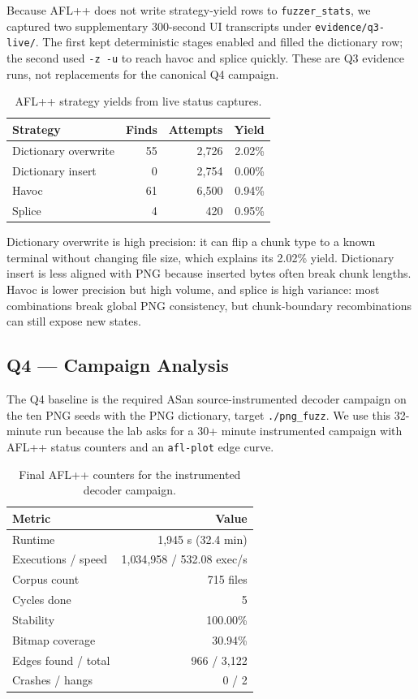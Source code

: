 \documentclass[letterpaper,twocolumn,10pt]{article}
\begin{document}
Because AFL++ does not write strategy-yield rows to \texttt{fuzzer\_stats}, we
captured two supplementary 300-second UI transcripts under
\texttt{evidence/q3-live/}. The first kept deterministic stages enabled and
filled the dictionary row; the second used \texttt{-z -u} to reach havoc and
splice quickly. These are Q3 evidence runs, not replacements for the canonical
Q4 campaign.

\begin{table}[h]
\centering
\small
\begin{tabular}{lrrr}
\toprule
\textbf{Strategy} & \textbf{Finds} & \textbf{Attempts} & \textbf{Yield} \\
\midrule
Dictionary overwrite & 55 & 2{,}726 & 2.02\% \\
Dictionary insert & 0 & 2{,}754 & 0.00\% \\
Havoc & 61 & 6{,}500 & 0.94\% \\
Splice & 4 & 420 & 0.95\% \\
\bottomrule
\end{tabular}
\caption{AFL++ strategy yields from live status captures.}
\end{table}

Dictionary overwrite is high precision: it can flip a chunk type to a known
terminal without changing file size, which explains its 2.02\% yield. Dictionary
insert is less aligned with PNG because inserted bytes often break chunk
lengths. Havoc is lower precision but high volume, and splice is high variance:
most combinations break global PNG consistency, but chunk-boundary
recombinations can still expose new states.

\subsection{Q4 --- Campaign Analysis}
The Q4 baseline is the required ASan source-instrumented decoder campaign on
the ten PNG seeds with the PNG dictionary, target \texttt{./png\_fuzz}. We use
this 32-minute run because the lab asks for a 30+ minute instrumented campaign
with AFL++ status counters and an \texttt{afl-plot} edge curve.

\begin{table}[h]
\centering
\small
\begin{tabular}{lr}
\toprule
\textbf{Metric} & \textbf{Value} \\
\midrule
Runtime & 1{,}945 s (32.4 min) \\
Executions / speed & 1{,}034{,}958 / 532.08 exec/s \\
Corpus count & 715 files \\
Cycles done & 5 \\
Stability & 100.00\% \\
Bitmap coverage & 30.94\% \\
Edges found / total & 966 / 3{,}122 \\
Crashes / hangs & 0 / 2 \\
\bottomrule
\end{tabular}
\caption{Final AFL++ counters for the instrumented decoder campaign.}
\end{table}
\end{document}
